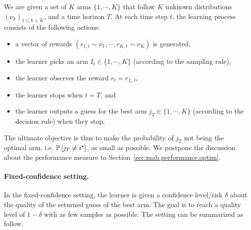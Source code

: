 \begin{definition}\label{def:mab.bai_budget}
\begin{leftbar}[defnbar]
	We are given a set of $K$ arms $\{1,\cdots,K\}$ that follow $K$ unknown distributions $(\nu_k)_{1 \leq k \leq K}$, and a time horizon $T$. At each time step $t$, the learning process consists of the following actions:
\begin{itemize}
	\item a vector of rewards $(r_{1,t} \sim \nu_1, \cdots, r_{K,t} \sim \nu_K)$ is generated,
	\item the learner picks an arm $I_t \in \{1,\cdots,K\}$ (according to the sampling rule),
	\item the learner observes the reward $r_t = r_{I_t, t}$,
	\item the learner stops when $t=T$, and
	\item the learner outputs a guess for the best arm $j_T \in \{1,\cdots,K\}$ (according to the decision rule) when they stop.
\end{itemize}
\end{leftbar}
\end{definition}

The ultimate objective is thus to make the probability of $j_T$ not being the optimal arm, i.e. $\mathbb{P}\left[j_T\neq i^{\star}\right]$, as small as possible. We postpone the discussion about the performance measure to Section~\ref{sec:mab.performance.optim}.

\paragraph{Fixed-confidence setting.}

In the fixed-confidence setting, the learner is given a confidence level/risk $\delta$ about the quality of the returned guess of the best arm. The goal is to reach a quality level of $1-\delta$ with as few samples as possible. The setting can be summarized as follow.

